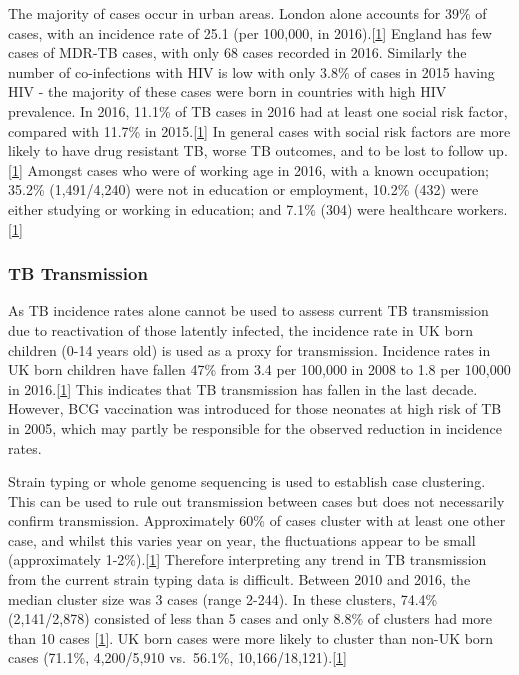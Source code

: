 \documentclass[11pt,twoside]{bristolthesis}
\begin{document}
  The majority of cases occur in urban areas. London alone accounts for 39\% of cases, with an incidence rate of 25.1 (per 100,000, in 2016).{[}\protect\hyperlink{ref-PHE2017}{1}{]} England has few cases of MDR-TB cases, with only 68 cases recorded in 2016. Similarly the number of co-infections with HIV is low with only 3.8\% of cases in 2015 having HIV - the majority of these cases were born in countries with high HIV prevalence. In 2016, 11.1\% of TB cases in 2016 had at least one social risk factor, compared with 11.7\% in 2015.{[}\protect\hyperlink{ref-PHE2017}{1}{]} In general cases with social risk factors are more likely to have drug resistant TB, worse TB outcomes, and to be lost to follow up. {[}\protect\hyperlink{ref-PHE2017}{1}{]} Amongst cases who were of working age in 2016, with a known occupation; 35.2\% (1,491/4,240) were not in education or employment, 10.2\% (432) were either studying or working in education; and 7.1\% (304) were healthcare workers.{[}\protect\hyperlink{ref-PHE2017}{1}{]}
  
  \hypertarget{tb-transmission}{%
  \subsubsection{TB Transmission}\label{tb-transmission}}
  
  As TB incidence rates alone cannot be used to assess current TB transmission due to reactivation of those latently infected, the incidence rate in UK born children (0-14 years old) is used as a proxy for transmission. Incidence rates in UK born children have fallen 47\% from 3.4 per 100,000 in 2008 to 1.8 per 100,000 in 2016.{[}\protect\hyperlink{ref-PHE2017}{1}{]} This indicates that TB transmission has fallen in the last decade. However, BCG vaccination was introduced for those neonates at high risk of TB in 2005, which may partly be responsible for the observed reduction in incidence rates.
  
  Strain typing or whole genome sequencing is used to establish case clustering. This can be used to rule out transmission between cases but does not necessarily confirm transmission. Approximately 60\% of cases cluster with at least one other case, and whilst this varies year on year, the fluctuations appear to be small (approximately 1-2\%).{[}\protect\hyperlink{ref-PHE2017}{1}{]} Therefore interpreting any trend in TB transmission from the current strain typing data is difficult. Between 2010 and 2016, the median cluster size was 3 cases (range 2-244). In these clusters, 74.4\% (2,141/2,878) consisted of less than 5 cases and only 8.8\% of clusters had more than 10 cases {[}\protect\hyperlink{ref-PHE2017}{1}{]}. UK born cases were more likely to cluster than non-UK born cases (71.1\%, 4,200/5,910 vs.~56.1\%, 10,166/18,121).{[}\protect\hyperlink{ref-PHE2017}{1}{]}
  
\end{document}

